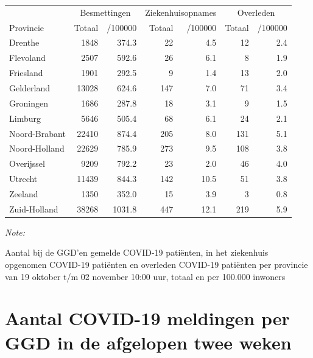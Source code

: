 \documentclass[
  english,
  man,floatsintext]{apa6}
\begin{document}
\begin{table}[H]
\centering
\begin{threeparttable}
\begin{tabular}{lrrrrrr}
\toprule
\multicolumn{1}{c}{ } & \multicolumn{2}{c}{Besmettingen} & \multicolumn{2}{c}{Ziekenhuisopnames} & \multicolumn{2}{c}{Overleden} \\
\cmidrule(l{3pt}r{3pt}){2-3} \cmidrule(l{3pt}r{3pt}){4-5} \cmidrule(l{3pt}r{3pt}){6-7}
Provincie & Totaal & /100000 & Totaal & /100000 & Totaal & /100000\\
\midrule
Drenthe & 1848 & 374.3 & 22 & 4.5 & 12 & 2.4\\
Flevoland & 2507 & 592.6 & 26 & 6.1 & 8 & 1.9\\
Friesland & 1901 & 292.5 & 9 & 1.4 & 13 & 2.0\\
Gelderland & 13028 & 624.6 & 147 & 7.0 & 71 & 3.4\\
Groningen & 1686 & 287.8 & 18 & 3.1 & 9 & 1.5\\
Limburg & 5646 & 505.4 & 68 & 6.1 & 24 & 2.1\\
Noord-Brabant & 22410 & 874.4 & 205 & 8.0 & 131 & 5.1\\
Noord-Holland & 22629 & 785.9 & 273 & 9.5 & 108 & 3.8\\
Overijssel & 9209 & 792.2 & 23 & 2.0 & 46 & 4.0\\
Utrecht & 11439 & 844.3 & 142 & 10.5 & 51 & 3.8\\
Zeeland & 1350 & 352.0 & 15 & 3.9 & 3 & 0.8\\
Zuid-Holland & 38268 & 1031.8 & 447 & 12.1 & 219 & 5.9\\
\bottomrule
\end{tabular}
\begin{tablenotes}
\item \textit{Note: } 
\item Aantal bij de GGD’en gemelde COVID-19 patiënten, in het ziekenhuis opgenomen COVID-19 patiënten en overleden COVID-19 patiënten per provincie van 19 oktober t/m 02 november 10:00 uur, totaal en per 100.000 inwoners
\end{tablenotes}
\end{threeparttable}
\end{table}

\newpage

\hypertarget{aantal-covid-19-meldingen-per-ggd-in-de-afgelopen-twee-weken}{%
\section{Aantal COVID-19 meldingen per GGD in de afgelopen twee weken}\label{aantal-covid-19-meldingen-per-ggd-in-de-afgelopen-twee-weken}}
\end{document}
